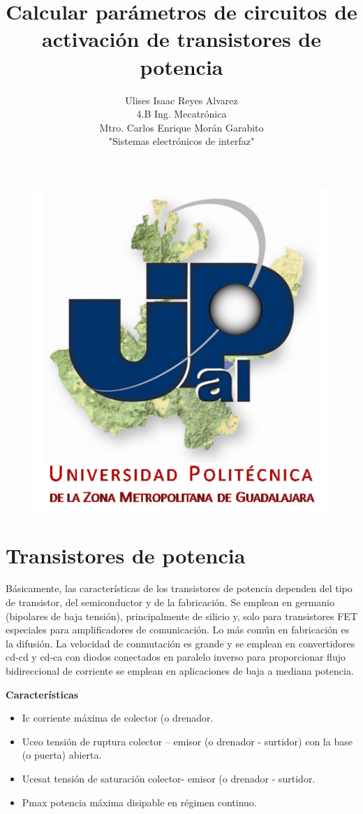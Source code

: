 \documentclass[10pt,a4paper]{article}
\author{Ulises Isaac Reyes Alvarez\\4.B Ing. Mecatrónica\\Mtro. Carlos Enrique Morán Garabito\\"Sistemas electrónicos de interfaz"}
\title{Calcular parámetros de circuitos de activación de transistores de potencia}
\begin{document}
\maketitle
\begin{figure}[hbtp]
\centering
\includegraphics[scale=1.75]{imagenes/UPZMG.png}
\end{figure}

\newpage
\section{Transistores de potencia}
Básicamente, las características de los transistores de potencia dependen del tipo de transistor, del semiconductor y de la fabricación. Se emplean en germanio (bipolares de baja tensión), principalmente de silicio y, solo para transistores FET especiales para amplificadores de comunicación. Lo más común en fabricación es la difusión. La velocidad de conmutación es grande y se emplean en convertidores cd-cd y cd-ca con diodos conectados en paralelo inverso para proporcionar flujo bidireccional de corriente se emplean en aplicaciones de baja a mediana potencia.

\textbf{Características} 
\begin{itemize}
\item Ic corriente máxima de colector (o drenador.
\item Uceo tensión de ruptura colector – emisor (o drenador  - surtidor) con la base (o puerta) abierta.
\item Ucesat  tensión de saturación colector- emisor (o drenador  - surtidor.
\item Pmax  potencia máxima disipable en régimen continuo.\\
\end{itemize}
\end{document}
